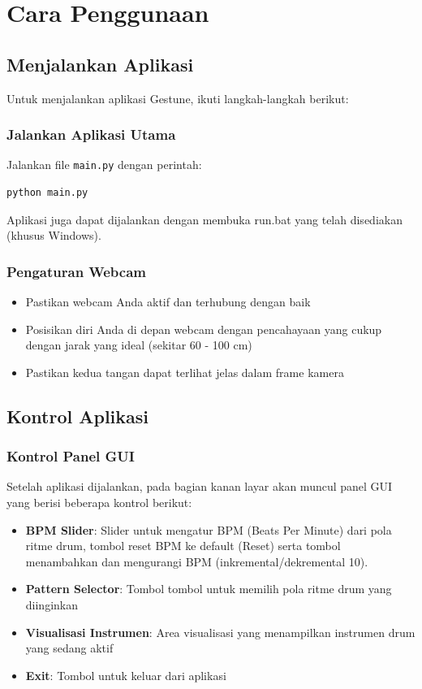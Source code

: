 \section{Cara Penggunaan}

\subsection{Menjalankan Aplikasi}

Untuk menjalankan aplikasi Gestune, ikuti langkah-langkah berikut:

\subsubsection{Jalankan Aplikasi Utama}
Jalankan file \texttt{main.py} dengan perintah:

\begin{lstlisting}[language=bash]
python main.py
\end{lstlisting}

Aplikasi juga dapat dijalankan dengan membuka run.bat yang telah disediakan (khusus Windows).

\subsubsection{Pengaturan Webcam}
\begin{itemize}
    \item Pastikan webcam Anda aktif dan terhubung dengan baik
    \item Posisikan diri Anda di depan webcam dengan pencahayaan yang cukup dengan jarak yang ideal (sekitar 60 - 100 cm)
    \item Pastikan kedua tangan dapat terlihat jelas dalam frame kamera
\end{itemize}

\subsection{Kontrol Aplikasi}
\subsubsection{Kontrol Panel GUI}
Setelah aplikasi dijalankan, pada bagian kanan layar akan muncul panel GUI yang berisi beberapa kontrol berikut:
\begin{itemize}
    \item \textbf{BPM Slider}: Slider untuk mengatur BPM (Beats Per Minute) dari pola ritme drum, tombol reset BPM ke default (Reset) serta tombol menambahkan dan mengurangi BPM (inkremental/dekremental 10).
    \item \textbf{Pattern Selector}: Tombol tombol untuk memilih pola ritme drum yang diinginkan
    \item \textbf{Visualisasi Instrumen}: Area visualisasi yang menampilkan instrumen drum yang sedang aktif
    \item \textbf{Exit}: Tombol untuk keluar dari aplikasi
\end{itemize}

